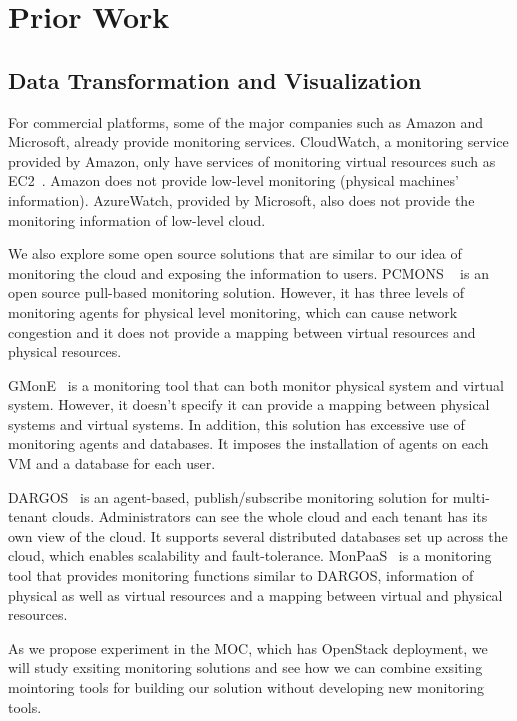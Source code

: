 

\section{Prior Work}
\label{sec:PriorWork}



\subsection{Data Transformation and Visualization}

For commercial platforms, some of the major companies such as Amazon and Microsoft, already provide monitoring services. CloudWatch, a monitoring service provided by Amazon, only have services of monitoring virtual resources such as EC2~\cite{Aceto2013}. Amazon does not provide low-level monitoring (physical machines' information). AzureWatch, provided by Microsoft, also does not provide the monitoring information of low-level cloud. 

  We also explore some open source solutions that are similar to our idea of monitoring the cloud and exposing the information to users. PCMONS ~\cite{chaves2011toward} is an open source pull-based monitoring solution. However, it has three levels of monitoring agents for physical level monitoring, which can cause network congestion and it does not provide a mapping between virtual resources and physical resources. 

  GMonE~\cite{montes2013gmone} is a monitoring tool that can both monitor physical system and virtual system. However, it doesn't specify it can provide a mapping between physical systems and virtual systems. In addition, this solution has excessive use of monitoring agents and databases. It imposes the installation of agents on each VM and a database for each user. 

  DARGOS~\cite{povedano2013dargos}  is an agent-based, publish/subscribe monitoring solution for multi-tenant clouds. Administrators can see the whole cloud and each tenant has its own view of the cloud. It supports several distributed databases set up across the cloud, which enables scalability and fault-tolerance. MonPaaS~\cite{alcaraz2015monpaas} is a monitoring tool that provides monitoring functions similar to DARGOS, information of physical as well as virtual resources and a mapping between virtual and physical resources. 

  As we propose experiment in the MOC, which has OpenStack deployment, we will study exsiting monitoring solutions and see how we can combine exsiting mointoring tools for building our solution without developing new monitoring tools. 